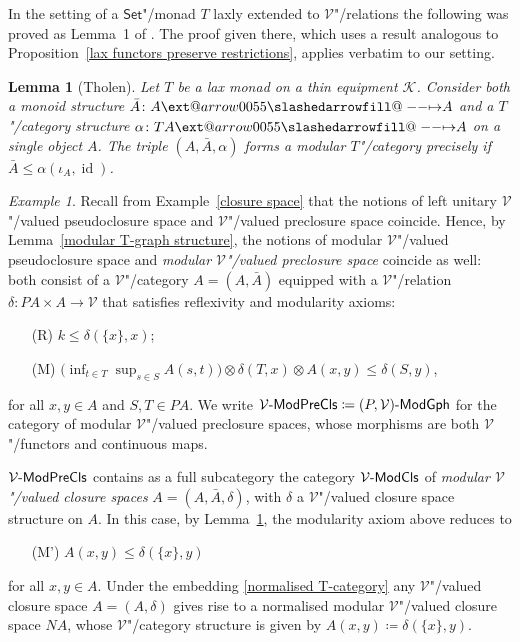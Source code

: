 \documentclass[preprint, a4paper]{elsarticle}
\makeatletter
\def\slashedarrowfill@#1#2#3#4#5{%
  $\m@th\thickmuskip0mu\medmuskip\thickmuskip\thinmuskip\thickmuskip
   \relax#5#1\mkern-7mu%
   \cleaders\hbox{$#5\mkern-2mu#2\mkern-2mu$}\hfill
   \mathclap{#3}\mathclap{#2}%
   \cleaders\hbox{$#5\mkern-2mu#2\mkern-2mu$}\hfill
   \mkern-7mu#4$%
}
\def\rightslashedarrowfill@{%
  \slashedarrowfill@\relbar\relbar\mapstochar\rightarrow}
\newcommand\xslashedrightarrow[2][]{%
  \ext@arrow 0055{\rightslashedarrowfill@}{#1}{#2}}
\def\slashedrightarrow{\xslashedrightarrow{}}
\newtheorem{lemma}[theorem]{Lemma}
\theoremstyle{definition}
\theoremstyle{remark}
\newtheorem{example}[theorem]{Example}
\providecommand{\exref}[1]{Example~\ref{#1}}
\providecommand{\lemref}[1]{Lemma~\ref{#1}}
\providecommand{\propref}[1]{Proposition~\ref{#1}}
\providecommand{\dfn}{\coloneqq}
\providecommand{\tens}{\otimes}
\providecommand{\brcs}[1]{\lbrace #1 \rbrace}
\providecommand{\bigpars}[1]{\bigl(#1\bigr)}
\providecommand{\set}[1]{\brcs{#1}}
\providecommand{\map}[3]{#1\colon#2\to#3}
\providecommand{\hmap}[3]{#1\colon#2\slashedrightarrow#3}
\DeclareMathOperator{\id}{id}
\providecommand{\catvar}[1]{\mathcal{#1}}
\providecommand{\2}{\mathsf 2}
\providecommand{\K}{\catvar K}
\providecommand{\V}{\catvar V}
\providecommand{\Set}{\mathsf{Set}}
\providecommand{\ModCls}[1]{#1\text-\mathsf{ModCls}}
\providecommand{\ModPreCls}[1]{#1\text-\mathsf{ModPreCls}}
\providecommand{\ModGph}[1]{#1\text-\mathsf{ModGph}}
\makeatother
\begin{document}
  In the setting of a $\Set$"/monad $T$ laxly extended to $\V$"/relations the following was proved as Lemma~1 of \cite{Tholen09}. The proof given there, which uses a result analogous to \propref{lax functors preserve restrictions}, applies verbatim to our setting.
  \begin{lemma}[Tholen] \label{compatibility of modular structure}
  	Let $T$ be a lax monad on a thin equipment $\K$. Consider both a monoid structure $\hmap{\bar A}AA$ and a $T$"/category structure $\hmap\alpha{TA}A$ on a single object $A$. The triple $(A, \bar A, \alpha)$ forms a modular $T$"/category precisely if $\bar A \leq \alpha(\iota_A, \id)$.
  \end{lemma}
  
  \begin{example} \label{modular closure space}
  	Recall from \exref{closure space} that the notions of left unitary $\V$"/valued pseudoclosure space and $\V$"/valued preclosure space coincide. Hence, by \lemref{modular T-graph structure}, the notions of modular $\V$"/valued pseudoclosure space and \emph{modular $\V$"/valued preclosure space} coincide as well: both consist of a $\V$"/category $A = (A, \bar A)$ equipped with a $\V$"/relation $\map\delta{PA \times A}\V$ that satisfies reflexivity and modularity axioms:
  	\begin{enumerate}
  		\item[(R)] $k \leq \delta(\set x, x)$;
  		\item[(M)] $\bigpars{\inf_{t \in T}\sup_{s \in S} A(s, t)} \tens \delta(T, x) \tens A(x, y) \leq \delta(S, y)$,
  	\end{enumerate}
  	for all $x, y \in A$ and $S, T \in PA$. We write $\ModPreCls\V \dfn \ModGph{(P, \V)}$ for the category of modular $\V$"/valued preclosure spaces, whose morphisms are both $\V$"/functors and continuous maps.
  	
  	$\ModPreCls\V$ contains as a full subcategory the category $\ModCls\V$ of \emph{modular $\V$"/valued closure spaces} $A = (A, \bar A, \delta)$, with $\delta$ a $\V$"/valued closure space structure on $A$. In this case, by \lemref{compatibility of modular structure}, the modularity axiom above reduces to
  	\begin{enumerate}
  		\item[(M')] $A(x, y) \leq \delta(\set x, y)$
  	\end{enumerate}
  	for all $x, y \in A$. Under the embedding \eqref{normalised T-category} any $\V$"/valued closure space $A = (A, \delta)$ gives rise to a normalised modular $\V$"/valued closure space $NA$, whose $\V$"/category structure is given by $A(x, y) \dfn \delta(\set x, y)$.
  	

\end{example}
\end{document}

